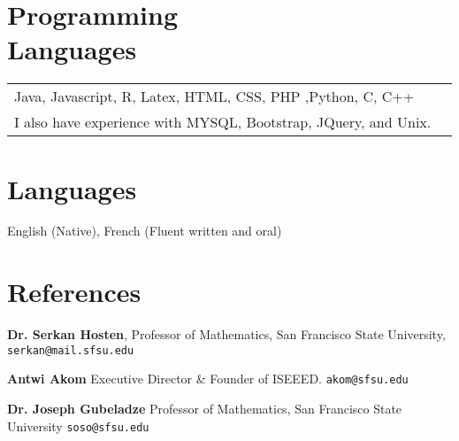 \documentclass[margin,line,pifont,palatino,courier]{res}
\begin{document}
\begin{resume}
\section{\sc Programming\\ Languages}

\begin{tabular}{@{}p{6in}p{3in}}

Java, Javascript, R, Latex, HTML, CSS, PHP ,Python, C, C++\\
I also have experience with MYSQL, Bootstrap, JQuery, and Unix. 


\end{tabular}
\section{\sc Languages}
  English (Native), French (Fluent written and oral)


\section{\sc References}
{\bf Dr. Serkan Hosten}, Professor of Mathematics, San Francisco State University,
\texttt{serkan@mail.sfsu.edu}

{\bf Antwi Akom} Executive Director \& Founder of ISEEED.
  \texttt{akom@sfsu.edu} 
  
  {\bf Dr. Joseph Gubeladze}   Professor of Mathematics, San Francisco State University \texttt{soso@sfsu.edu}

\newpage


\end{resume}
\end{document}
